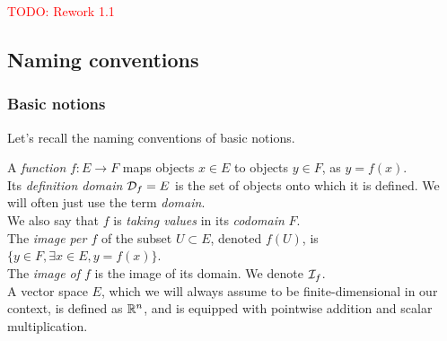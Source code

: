 \textcolor{red}{TODO: Rework 1.1}







\subsection{Naming conventions}
\label{basic}

\subsubsection{Basic notions}

Let's recall the naming conventions of basic notions.

A \emph{function} $f: E \rightarrow F$ maps objects $x \in E$ to objects $y \in F$, as $y = f(x)$.\\
Its \emph{definition domain} $\mathcal{D}_f = E$ is the set of objects onto which it is defined. We will often just use the term \emph{domain}.\\
We also say that $f$ is \emph{taking values} in its \emph{codomain} $F$.\\
The \emph{image per $f$} of the subset $U \subset E$, denoted $f(U)$, is $\{y \in F, \exists x \in E, y = f(x)\}$.\\
The \emph{image of $f$} is the image of its domain. We denote $\mathcal{I}_f$.\\
A vector space $E$, which we will always assume to be finite-dimensional in our context, is defined as $\mathbb{R}^n$, and is equipped with pointwise addition and scalar multiplication.%

